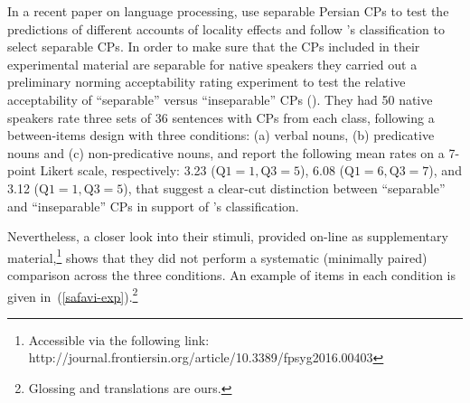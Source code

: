 \documentclass[output=paper]{langsci/langscibook}
\begin{document}
In a recent paper on language processing, \citet{SafaviEtal2016} use separable Persian CPs to test the predictions of different accounts of locality effects and follow \citeauthor{Karimi-Doostan:2011}'s classification to select separable CPs. In order to make sure that the CPs included in their experimental material are separable for native speakers they carried out a preliminary norming acceptability rating experiment to test the relative acceptability of ``separable'' versus ``inseparable'' CPs (\citeyear[4]{SafaviEtal2016}). 
They had 50 native speakers rate three sets of 36 sentences with CPs from each class, following a between-items design with three conditions: (a) verbal nouns, (b) predicative nouns and (c) non-predicative nouns, and report the following mean rates on a 7-point Likert scale, respectively: 3.23 ($\text{Q1}=1, \text{Q3}=5$), 6.08 ($\text{Q1}=6, \text{Q3}=7$), and 3.12 ($\text{Q1}=1, \text{Q3}=5$), that suggest a clear-cut distinction between ``separable'' and ``inseparable'' CPs in support of \citeauthor{Karimi-Doostan1997}'s classification.

Nevertheless, a closer look into their stimuli, provided on-line as supplementary material,\footnote{Accessible via the following link: http://journal.frontiersin.org/article/10.3389/fpsyg2016.00403} shows that they did not perform a systematic (minimally paired) comparison across the three conditions. 
An example of items in each condition is given in~(\ref{safavi-exp}).\footnote{Glossing and translations are ours.}

\begin{exe}
	\ex\label{safavi-exp}
	\begin{xlist}
		
	\end{xlist}
\end{exe}
\end{document}
